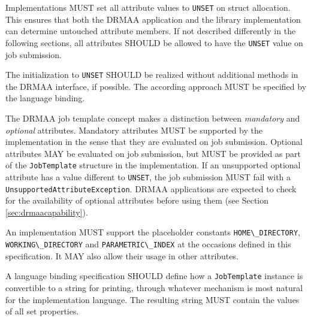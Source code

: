 \documentclass{article}
\newcommand{\h}[1]{\lstinline|#1|}
\newcommand{\langbind}[1]{\begin{shaded}#1\end{shaded}}
\newcommand{\rat}[1]{}
\begin{document}


Implementations MUST set all attribute values to \h{UNSET} on struct allocation. This ensures that both the DRMAA application and the library implementation can determine untouched attribute members. If not described differently in the following sections, all attributes SHOULD be allowed to have the \h{UNSET} value on job submission.

\langbind{
The initialization to \h{UNSET} SHOULD be realized without additional methods in the DRMAA interface, if possible. The according approach MUST be specified by the language binding. 
}

The DRMAA job template concept makes a distinction between \emph{mandatory} and \emph{optional} attributes. Mandatory attributes MUST be supported by the implementation in the sense that they are evaluated on job submission. Optional attributes MAY be evaluated on job submission, but MUST be provided as part of the \h{JobTemplate} structure in the implementation. If an unsupported optional attribute has a value different to \h{UNSET}, the job submission MUST fail with a \h{UnsupportedAttributeException}. DRMAA applications are expected to check for the availability of optional attributes before using them (see Section \ref{sec:drmaacapability}).

An implementation MUST support the placeholder constants \h{HOME\_DIRECTORY}, \h{WORKING\_DIRECTORY} and \h{PARAMETRIC\_INDEX} at the occasions defined in this specification. It MAY also allow their usage in other attributes.

\langbind{
A language binding specification SHOULD define how a \h{JobTemplate} instance is convertible to a string for printing, through whatever mechanism is most natural for the implementation language. The resulting string MUST contain the values of all set properties.
}

\rat{
Comparison to DRMAA 1.0: JobTemplate is now a value type, meaning that it maps to a struct in C. This removes the need for DRMAA-defined methods for construction and destruction of job templates. An eventual RPC scenario for DRMAA gets easier with this approach, since it is closer to the JSDL concept of a job description document. 

Supported placeholders for job template attributes must be filled with values by the language binding or the implementation. Invalid job template settings are now only detected on job submission, not when the attribute is set. 

DRMAA1 supported the utilization of new DRM features through an old DRMAA implementation, based on the \h{nativeSpecification} field. A conf call (Jul 14th 2010) voted for dropping this intentionally. Implementations should use according implementation-specific attributes for this.

GridEngine does not support to request a number of slots per machine - of course in a default installation, since you can do everything in GridEngine ... This is the reason for not having such an attribute.
}
\end{document}
